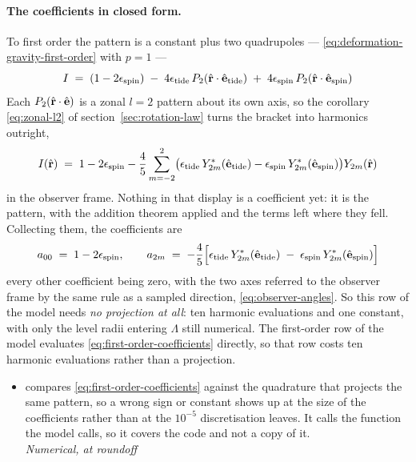 \paragraph{The coefficients in closed form.}  To first order the pattern is a constant plus
two quadrupoles --- \eqref{eq:deformation-gravity-first-order} with $p = 1$ ---
\begin{equation}
  I \;=\; (1 - 2\epsilon_\text{spin})
    \;-\; 4\epsilon_\text{tide}\,P_2(\hat{\mathbf r}\cdot\hat{\mathbf e}_\text{tide})
    \;+\; 4\epsilon_\text{spin}\,P_2(\hat{\mathbf r}\cdot\hat{\mathbf e}_\text{spin})
  \label{eq:first-order-pattern}
\end{equation}
Each $P_2(\hat{\mathbf r}\cdot\hat{\mathbf e})$ is a zonal $l = 2$ pattern about its own axis, so the corollary
\eqref{eq:zonal-l2} of section~\ref{sec:rotation-law} turns the bracket into harmonics
outright,
\begin{equation}
  I(\hat{\mathbf r}) \;=\; 1 - 2\epsilon_\text{spin}
    - \frac{4}{5}\sum_{m=-2}^{2}\bigl(
      \epsilon_\text{tide}\,Y_{2m}^*(\hat{\mathbf e}_\text{tide})
      - \epsilon_\text{spin}\,Y_{2m}^*(\hat{\mathbf e}_\text{spin})\bigr)
      Y_{2m}(\hat{\mathbf r})
  \label{eq:first-order-harmonics}
\end{equation}
in the observer frame.  Nothing in that display is a coefficient yet: it is the pattern, with
the addition theorem applied and the terms left where they fell.  Collecting them, the
coefficients are
\begin{equation}
  a_{00} \;=\; 1 - 2\epsilon_\text{spin} , \qquad
  a_{2m} \;=\; -\frac{4}{5}\Bigl[\epsilon_\text{tide}\,
      Y_{2m}^*(\hat{\mathbf e}_\text{tide})
    \;-\; \epsilon_\text{spin}\,Y_{2m}^*(\hat{\mathbf e}_\text{spin})\Bigr]
  \label{eq:first-order-coefficients}
\end{equation}
every other coefficient being zero, with the two axes referred to the observer frame by the
same rule as a sampled direction, \eqref{eq:observer-angles}.  So this row of the model
needs \emph{no projection at all}: ten harmonic evaluations and one constant, with only the
level radii entering $\Lambda$ still numerical.  The first-order row of the model evaluates
\eqref{eq:first-order-coefficients} directly, so that row costs ten harmonic evaluations rather
than a projection.

\begin{itemize}
  \item[$\checkmark$]  compares \eqref{eq:first-order-coefficients}
    against the quadrature that projects the same pattern, so a wrong sign or constant shows up at
    the size of the coefficients rather than at the $10^{-5}$ discretisation leaves.  It calls the
    function the model calls, so it covers the code and not a copy of it.
    \\[1pt] \quad \emph{Numerical, at roundoff}
\end{itemize}


